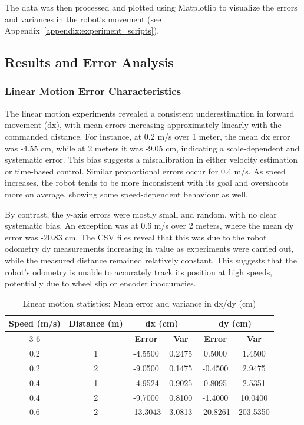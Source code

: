 \documentclass[a4paper, 12pt]{article}
\begin{document}
    The data was then processed and plotted using Matplotlib to visualize the errors and variances in the robot's movement (see Appendix~\ref{appendix:experiment_scripts}).

    \subsection{Results and Error Analysis}

    \subsubsection{Linear Motion Error Characteristics}

    The linear motion experiments revealed a consistent underestimation in forward movement (dx), with mean errors increasing approximately linearly with the commanded distance. For instance, at 0.2 m/s over 1 meter, the mean dx error was -4.55 cm, while at 2 meters it was -9.05 cm, indicating a scale-dependent and systematic error. This bias suggests a miscalibration in either velocity estimation or time-based control. Similar proportional errors occur for 0.4 m/s. As speed increases, the robot tends to be more inconsistent with its goal and overshoots more on average, showing some speed-dependent behaviour as well. 
    
    By contrast, the y-axis errors were mostly small and random, with no clear systematic bias. An exception was at 0.6 m/s over 2 meters, where the mean dy error was -20.83 cm. The CSV files reveal that this was due to the robot odometry dy measurements increasing in value as experiments were carried out, while the measured distance remained relatively constant. This suggests that the robot's odometry is unable to accurately track its position at high speeds, potentially due to wheel slip or encoder inaccuracies.

    \begin{table}[H]
    \centering
    \scriptsize
    \begin{tabular}{|c|c|cc|cc|}
    \hline
    \textbf{Speed (m/s)} & \textbf{Distance (m)} &
    \multicolumn{2}{c|}{\textbf{dx (cm)}} & \multicolumn{2}{c|}{\textbf{dy (cm)}} \\
    \cline{3-6}
    & & \textbf{Error} & \textbf{Var} & \textbf{Error} & \textbf{Var} \\
    \hline
    0.2 & 1 & -4.5500 & 0.2475 &  0.5000 & 1.4500 \\
    0.2 & 2 & -9.0500 & 0.1475 & -0.4500 & 2.9475 \\
    0.4 & 1 & -4.9524 & 0.9025 &  0.8095 & 2.5351 \\
    0.4 & 2 & -9.7000 & 0.8100 & -1.4000 & 10.0400 \\
    0.6 & 2 & -13.3043 & 3.0813 & -20.8261 & 203.5350 \\
    \hline
    \end{tabular}
    \caption{Linear motion statistics: Mean error and variance in dx/dy (cm)}
    \end{table} 
\end{document}
